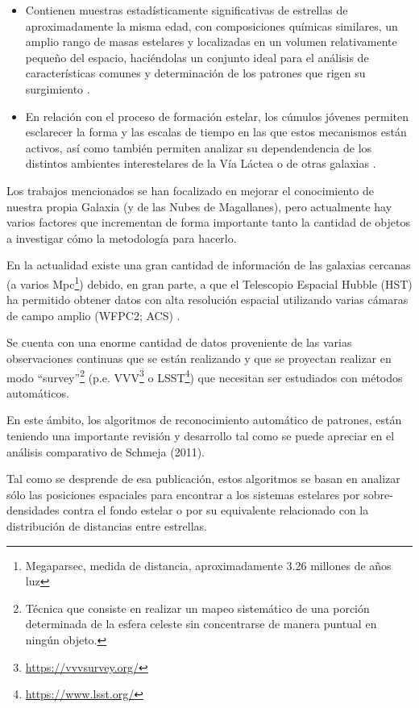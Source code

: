 \documentclass[
	11pt,oneside,a4paper,
	fleqn,
	article
]{memoir}
\begin{document}
\begin{itemize}
	\item Contienen muestras estadísticamente significativas de estrellas de aproximadamente la misma edad, con composiciones químicas similares, un amplio rango de masas estelares y localizadas en un volumen relativamente pequeño del espacio, haciéndolas un conjunto ideal para el análisis de características comunes y determinación de los patrones que rigen su surgimiento \cite{Klessen2000}.
	\item En relación con el proceso de formación estelar, los cúmulos jóvenes permiten esclarecer la forma y las escalas de tiempo en las que estos mecanismos están activos, así como también permiten analizar su dependendencia de los distintos ambientes interestelares de la Vía Láctea o de otras galaxias \cite{Fall2012}.
\end{itemize}

Los trabajos mencionados se han focalizado en mejorar el conocimiento de nuestra propia Galaxia (y de las Nubes de Magallanes\cite{Vazquez2008}), pero actualmente hay varios factores que incrementan de forma importante tanto la cantidad de objetos a investigar cómo la metodología para hacerlo.

En la actualidad existe una gran cantidad de información de las galaxias cercanas (a varios Mpc\footnote{Megaparsec, medida de distancia, aproximadamente 3.26 millones de años luz}) debido, en gran parte, a que el Telescopio Espacial Hubble (HST) ha permitido obtener datos con alta resolución espacial utilizando varias cámaras de campo amplio (WFPC2; ACS) \cite{Dalcanton2009}.

Se cuenta con una enorme cantidad de datos proveniente de las varias observaciones continuas que se están realizando y que se proyectan realizar en modo “survey”\footnote{Técnica que consiste en realizar un mapeo sistemático de una porción determinada de la esfera celeste sin concentrarse de manera puntual en ningún objeto.} (p.e. VVV\footnote{\url{https://vvvsurvey.org/}} o LSST\footnote{\url{https://www.lsst.org/}}) que necesitan ser estudiados con métodos automáticos. 

En este ámbito, los algoritmos de reconocimiento automático de patrones, están teniendo una importante revisión y desarrollo tal como se puede apreciar en el análisis comparativo de Schmeja (2011)\cite{Schmeja2011}.

Tal como se desprende de esa publicación, estos algoritmos se basan en analizar sólo las posiciones espaciales para encontrar a los sistemas estelares por sobre-densidades contra el fondo estelar o por su equivalente relacionado con la distribución de distancias entre estrellas.
\end{document}

